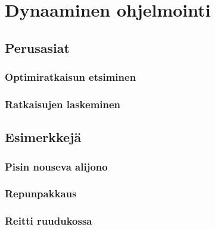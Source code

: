 \chapter{Dynaaminen ohjelmointi}

\section{Perusasiat}

\subsection{Optimiratkaisun etsiminen}

\subsection{Ratkaisujen laskeminen}

\section{Esimerkkejä}

\subsection{Pisin nouseva alijono}

\subsection{Repunpakkaus}

\subsection{Reitti ruudukossa}
